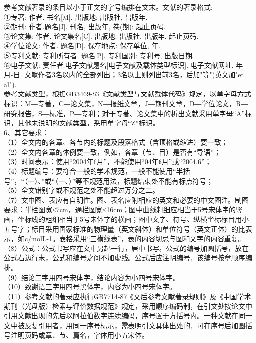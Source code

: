 \documentclass{xmuthesis}
\begin{document}
\begin{flushleft}
参考文献著录的条目以小于正文的字号编排在文末。文献的著录格式:\\
    ①专著: 作者. 书名[M]. 出版地: 出版社, 出版年.\\
    ②期刊: 作者.题名[J]. 刊名, 出版年, 卷(期): 起止页码.\\
    ③论文集: 作者. 论文集名[C]. 出版地: 出版社, 出版年. 起止页码.\\
    ④学位论文: 作者. 题名[D]. 保存地点: 保存单位, 年.\\
    ⑤专利文献: 专利所有者. 题名[P]. 专利国别: 专利号, 出版日期.\\
    ⑥电子文献: 责任者.电子文献题名[电子文献及载体类型标识]. 电子文献网址. 年-月-日. 文献作者3名以内的全部列出；3名以上则列出前3名，后加"等"(英文加"et al").\\
    参考文献类型，根据GB3469-83《文献类型与文献载体代码》规定，以单字母方式标识：M―专著，C―论文集，N―报纸文章，J―期刊文章，D―学位论文，R―研究报告，S―标准，P―专利；对于专著、论文集中的析出文献采用单字母“A”标识，其他未说明的文献类型，采用单字母“Z”标识。\\
    6、其它要求：\\
   （1）全文内的各章、各节内的标题及段落格式（含顶格或缩进）要一致；\\
   （2）全文内各章的体例要一致，例如，各章（节、目）是否有“导语”；\\
   （3）时间表示：使用“2004年6月”，不能使用“04年6月”或“2004.6”；\\
   （4）标题编号：要符合一般的学术规范，一般不能使用“半括号”，“（一）、”或“（一、）”等不规范用法，标题结束处不能有标点符号；\\
   （5）全文错别字或不规范之处不能超过万分之二。\\（7）文中图、表应有自明性。图、表名应附相应的英文和必要的中文图注。制图要求：半栏图宽≤7cm，通栏图宽≤16cm；图中曲线粗细应相当于5号宋体字的竖画，坐标线的粗细相当于5号宋体字的横画；图中文字、符号、纵横坐标标目用小五号字；标目采用国家标准的物理量（英文斜体）和单位符号（英文正体）的比表示，如c/molL-1。表格采用“三横线表”，表的内容切忌与图和文字的内容重复。\\
   （8）公式：公式书写应在文中另起一行，居中书写。公式的编号加圆括号，放在公式右边行末，公式和编号之间不加虚线。公式后应注明编号，该编号按章顺序编排。\\
（9）结论二字用四号宋体字，结论内容为小四号宋体字。\\
（10）致谢语三字用四号黑体字，内容为小四号宋体字。\\
   （11）参考文献的著录应执行GB7714-87《文后参考文献著录规则》及《中国学术期刊（光盘版）检索与评价数据规范》规定，采用顺序编码制，在引文处按论文中引用文献出现的先后以阿拉伯数字连续编码，序号置于方括号内。一种文献在同一文中被反复引用者，用同一序号标示，需表明引文具体出处的，可在序号后加圆括号注明页码或章、节、篇名，字体用小五宋体。\\

\end{flushleft}
\end{document}
